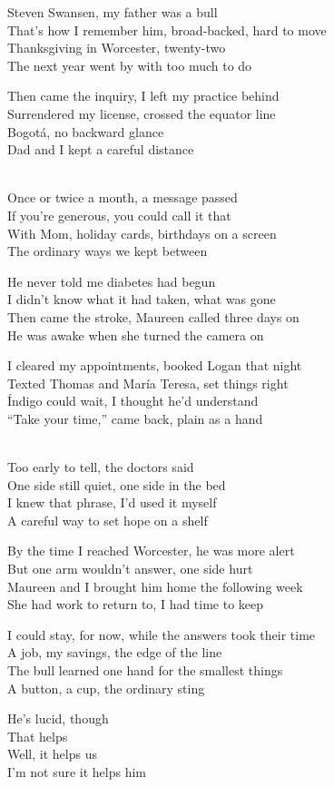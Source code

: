 \begin{lyrics}
Steven Swansen, my father was a bull\\
That’s how I remember him, broad-backed, hard to move\\
Thanksgiving in Worcester, twenty-two\\
The next year went by with too much to do

Then came the inquiry, I left my practice behind\\
Surrendered my license, crossed the equator line\\
Bogotá, no backward glance\\
Dad and I kept a careful distance

\\
Once or twice a month, a message passed\\
If you’re generous, you could call it that\\
With Mom, holiday cards, birthdays on a screen\\
The ordinary ways we kept between

He never told me diabetes had begun\\
I didn’t know what it had taken, what was gone\\
Then came the stroke, Maureen called three days on\\
He was awake when she turned the camera on

I cleared my appointments, booked Logan that night\\
Texted Thomas and María Teresa, set things right\\
Índigo could wait, I thought he’d understand\\
“Take your time,” came back, plain as a hand

\\
Too early to tell, the doctors said\\
One side still quiet, one side in the bed\\
I knew that phrase, I’d used it myself\\
A careful way to set hope on a shelf

By the time I reached Worcester, he was more alert\\
But one arm wouldn’t answer, one side hurt\\
Maureen and I brought him home the following week\\
She had work to return to, I had time to keep

I could stay, for now, while the answers took their time\\
A job, my savings, the edge of the line\\
The bull learned one hand for the smallest things\\
A button, a cup, the ordinary sting

He’s lucid, though\\
That helps\\
Well, it helps us\\
I’m not sure it helps him
\end{lyrics}

